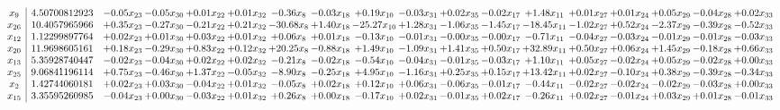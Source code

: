 \documentclass[9pt]{article}
\begin{document}
 \[\begin{array}{c| c c@{\hskip 2pt} c@{\hskip 2pt} c@{\hskip 2pt} c@{\hskip 2pt} c@{\hskip 2pt} c@{\hskip 2pt} c@{\hskip 2pt} c@{\hskip 2pt} c@{\hskip 2pt} c@{\hskip 2pt} c@{\hskip 2pt} c@{\hskip 2pt} c@{\hskip 2pt} c@{\hskip 2pt} c@{\hskip 2pt} c@{\hskip 2pt} }
 x_{9}   &  4.50700812923 & -0.05 x_{23} & -0.05 x_{30} & +  0.01 x_{22} & +  0.01 x_{32} & -0.36 x_{8} & -0.03 x_{18} & +  0.19 x_{10} & -0.03 x_{31} & +  0.02 x_{35} & -0.02 x_{17} & +  1.48 x_{11} & +  0.01 x_{27} & +  0.01 x_{24} & +  0.05 x_{29} & -0.04 x_{28} & +  0.02 x_{33}\\
 x_{26}   &  10.4057965966 & +  0.35 x_{23} & -0.27 x_{30} & -0.21 x_{22} & +  0.21 x_{32} & -30.68 x_{8} & +  1.40 x_{18} & -25.27 x_{10} & +  1.28 x_{31} & -1.06 x_{35} & -1.45 x_{17} & -18.45 x_{11} & -1.02 x_{27} & +  0.52 x_{24} & -2.37 x_{29} & -0.39 x_{28} & -0.52 x_{33}\\
 x_{12}   &  1.12299897764 & +  0.02 x_{23} & +  0.01 x_{30} & +  0.03 x_{22} & +  0.01 x_{32} & +  0.06 x_{8} & +  0.01 x_{18} & -0.13 x_{10} & -0.01 x_{31} & -0.00 x_{35} & -0.00 x_{17} & -0.71 x_{11} & -0.04 x_{27} & -0.03 x_{24} & -0.01 x_{29} & -0.01 x_{28} & -0.03 x_{33}\\
 x_{20}   &  11.9698605161 & +  0.18 x_{23} & -0.29 x_{30} & +  0.83 x_{22} & +  0.12 x_{32} & + 20.25 x_{8} & -0.88 x_{18} & +  1.49 x_{10} & -1.09 x_{31} & +  1.41 x_{35} & +  0.50 x_{17} & + 32.89 x_{11} & +  0.50 x_{27} & +  0.06 x_{24} & +  1.45 x_{29} & -0.18 x_{28} & +  0.66 x_{33}\\
 x_{13}   &  5.35928740447 & -0.02 x_{23} & -0.04 x_{30} & +  0.02 x_{22} & +  0.02 x_{32} & -0.21 x_{8} & -0.02 x_{18} & -0.54 x_{10} & -0.04 x_{31} & -0.01 x_{35} & -0.03 x_{17} & +  1.10 x_{11} & +  0.05 x_{27} & -0.02 x_{24} & +  0.05 x_{29} & -0.02 x_{28} & +  0.00 x_{33}\\
 x_{25}   &  9.06841196114 & +  0.75 x_{23} & -0.46 x_{30} & +  1.37 x_{22} & -0.05 x_{32} & -8.90 x_{8} & -0.25 x_{18} & +  4.95 x_{10} & -1.16 x_{31} & +  0.25 x_{35} & +  0.15 x_{17} & + 13.42 x_{11} & +  0.02 x_{27} & -0.10 x_{24} & +  0.38 x_{29} & -0.39 x_{28} & -0.34 x_{33}\\
 x_{2}   &  1.42744060181 & +  0.02 x_{23} & +  0.03 x_{30} & -0.04 x_{22} & +  0.01 x_{32} & -0.05 x_{8} & +  0.02 x_{18} & +  0.12 x_{10} & +  0.06 x_{31} & -0.06 x_{35} & -0.01 x_{17} & -0.44 x_{11} & -0.02 x_{27} & -0.02 x_{24} & -0.02 x_{29} & -0.03 x_{28} & +  0.00 x_{33}\\
 x_{15}   &  3.35595260985 & -0.04 x_{23} & +  0.00 x_{30} & -0.03 x_{22} & +  0.01 x_{32} & +  0.26 x_{8} & +  0.00 x_{18} & -0.17 x_{10} & +  0.02 x_{31} & -0.01 x_{35} & +  0.02 x_{17} & -0.26 x_{11} & +  0.02 x_{27} & -0.01 x_{24} & +  0.03 x_{29} & +  0.01 x_{28} & -0.01 x_{33}\\

\end{array}\]
\end{document}
